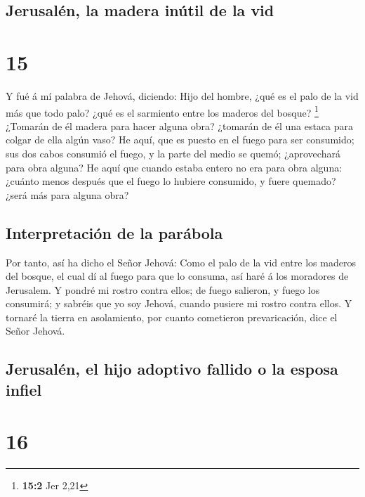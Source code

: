 \hypertarget{jerusaluxe9n-la-madera-inuxfatil-de-la-vid}{%
\subsection{Jerusalén, la madera inútil de la
vid}\label{jerusaluxe9n-la-madera-inuxfatil-de-la-vid}}

\hypertarget{section-14}{%
\section{15}\label{section-14}}

 Y fué á mí palabra de Jehová, diciendo:  Hijo
del hombre, ¿qué es el palo de la vid más que todo palo? ¿qué es el
sarmiento entre los maderos del bosque? \footnote{\textbf{15:2} Jer 2,21}
 ¿Tomarán de él madera para hacer alguna obra? ¿tomarán de
él una estaca para colgar de ella algún vaso?  He aquí, que
es puesto en el fuego para ser consumido; sus dos cabos consumió el
fuego, y la parte del medio se quemó; ¿aprovechará para obra alguna?
 He aquí que cuando estaba entero no era para obra alguna:
¿cuánto menos después que el fuego lo hubiere consumido, y fuere
quemado? ¿será más para alguna obra?

\hypertarget{interpretaciuxf3n-de-la-paruxe1bola}{%
\subsection{Interpretación de la
parábola}\label{interpretaciuxf3n-de-la-paruxe1bola}}

 Por tanto, así ha dicho el Señor Jehová: Como el palo de la
vid entre los maderos del bosque, el cual dí al fuego para que lo
consuma, así haré á los moradores de Jerusalem.  Y pondré mi
rostro contra ellos; de fuego salieron, y fuego los consumirá; y sabréis
que yo soy Jehová, cuando pusiere mi rostro contra ellos.  Y
tornaré la tierra en asolamiento, por cuanto cometieron prevaricación,
dice el Señor Jehová.

\hypertarget{jerusaluxe9n-el-hijo-adoptivo-fallido-o-la-esposa-infiel}{%
\subsection{Jerusalén, el hijo adoptivo fallido o la esposa
infiel}\label{jerusaluxe9n-el-hijo-adoptivo-fallido-o-la-esposa-infiel}}

\hypertarget{section-15}{%
\section{16}\label{section-15}}


